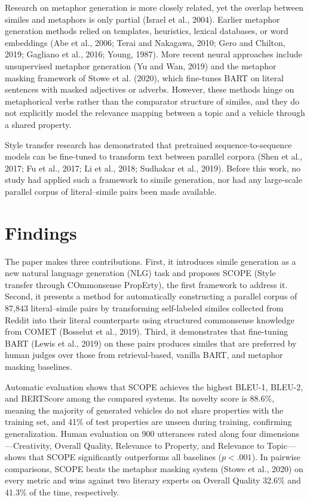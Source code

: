 \documentclass[12pt]{article}
\begin{document}
Research on metaphor generation is more closely related, yet the overlap between similes and metaphors is only partial (Israel et al., 2004). Earlier metaphor generation methods relied on templates, heuristics, lexical databases, or word embeddings (Abe et al., 2006; Terai and Nakagawa, 2010; Gero and Chilton, 2019; Gagliano et al., 2016; Young, 1987). More recent neural approaches include unsupervised metaphor generation (Yu and Wan, 2019) and the metaphor masking framework of Stowe et al. (2020), which fine-tunes BART on literal sentences with masked adjectives or adverbs. However, these methods hinge on metaphorical verbs rather than the comparator structure of similes, and they do not explicitly model the relevance mapping between a topic and a vehicle through a shared property.

Style transfer research has demonstrated that pretrained sequence-to-sequence models can be fine-tuned to transform text between parallel corpora (Shen et al., 2017; Fu et al., 2017; Li et al., 2018; Sudhakar et al., 2019). Before this work, no study had applied such a framework to simile generation, nor had any large-scale parallel corpus of literal--simile pairs been made available.

\section{Findings}

The paper makes three contributions. First, it introduces simile generation as a new natural language generation (NLG) task and proposes SCOPE (Style transfer through COmmonsense PropErty), the first framework to address it. Second, it presents a method for automatically constructing a parallel corpus of 87,843 literal--simile pairs by transforming self-labeled similes collected from Reddit into their literal counterparts using structured commonsense knowledge from COMET (Bosselut et al., 2019). Third, it demonstrates that fine-tuning BART (Lewis et al., 2019) on these pairs produces similes that are preferred by human judges over those from retrieval-based, vanilla BART, and metaphor masking baselines.

Automatic evaluation shows that SCOPE achieves the highest BLEU-1, BLEU-2, and BERTScore among the compared systems. Its novelty score is 88.6\%, meaning the majority of generated vehicles do not share properties with the training set, and 41\% of test properties are unseen during training, confirming generalization. Human evaluation on 900 utterances rated along four dimensions---Creativity, Overall Quality, Relevance to Property, and Relevance to Topic---shows that SCOPE significantly outperforms all baselines ($p < .001$). In pairwise comparisons, SCOPE beats the metaphor masking system (Stowe et al., 2020) on every metric and wins against two literary experts on Overall Quality 32.6\% and 41.3\% of the time, respectively.
\end{document}
